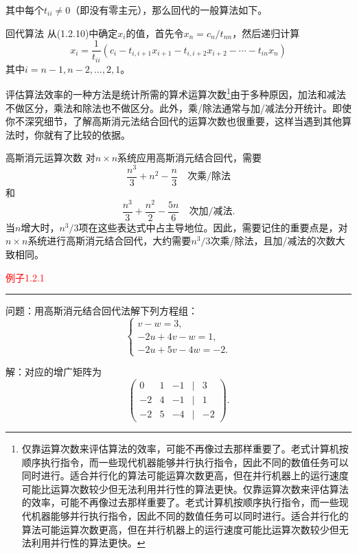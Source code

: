 其中每个\( t_{ii} \neq 0 \)（即没有零主元），那么回代的一般算法如下。
\begin{bluebox}{回代算法}
	从(1.2.10)中确定\( x_i \)的值，首先令\( x_n = c_n / t_{nn} \)，然后递归计算
	\[
	x_i = \frac{1}{t_{ii}} \left( c_i - t_{i,i+1}x_{i+1} - t_{i,i+2}x_{i+2} - \cdots - t_{in}x_n \right)
	\]
	其中\( i = n-1, n-2, \ldots, 2, 1 \)。
\end{bluebox}

评估算法效率的一种方法是统计所需的算术运算次数\footnote{仅靠运算次数来评估算法的效率，可能不再像过去那样重要了。老式计算机按顺序执行指令，而一些现代机器能够并行执行指令，因此不同的数值任务可以同时进行。适合并行化的算法可能运算次数更高，但在并行机器上的运行速度可能比运算次数较少但无法利用并行性的算法更快。仅靠运算次数来评估算法的效率，可能不再像过去那样重要了。老式计算机按顺序执行指令，而一些现代机器能够并行执行指令，因此不同的数值任务可以同时进行。适合并行化的算法可能运算次数更高，但在并行机器上的运行速度可能比运算次数较少但无法利用并行性的算法更快。}由于多种原因，加法和减法不做区分，乘法和除法也不做区分。此外，乘/除法通常与加/减法分开统计。即使你不深究细节，了解高斯消元法结合回代的运算次数也很重要，这样当遇到其他算法时，你就有了比较的依据。

\begin{bluebox}{高斯消元运算次数}
	对\( n \times n \)系统应用高斯消元结合回代，需要
	\[
	\frac{n^3}{3} + n^2 - \frac{n}{3} \quad \text{次乘/除法}
	\]
	和
	\[
	\frac{n^3}{3} + \frac{n^2}{2} - \frac{5n}{6} \quad \text{次加/减法}.
	\]
	当\( n \)增大时，\( n^3/3 \)项在这些表达式中占主导地位。因此，需要记住的重要点是，对\( n \times n \)系统进行高斯消元结合回代，大约需要\( n^3/3 \)次乘/除法，且加/减法的次数大致相同。
\end{bluebox}

\textcolor{red}{例子1.2.1}
\color{red}\rule{\textwidth}{0.4pt}\color{black}

问题：用高斯消元结合回代法解下列方程组：
\[
\begin{cases}
	v - w = 3, \\
	-2u + 4v - w = 1, \\
	-2u + 5v - 4w = -2.
\end{cases}
\]

解：对应的增广矩阵为
\[
\begin{pmatrix}
	0 & 1 & -1 & \big| & 3 \\
	-2 & 4 & -1 & \big| & 1 \\
	-2 & 5 & -4 & \big| & -2
\end{pmatrix}.
\]

